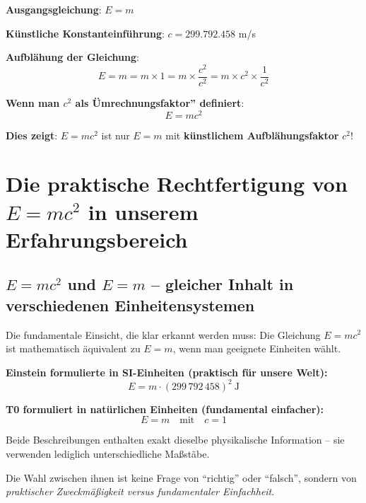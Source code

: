 	\textbf{Ausgangsgleichung}: $E = m$
	
	\textbf{Künstliche Konstanteinführung}: $c = 299.792.458$ m/s
	
	\textbf{Aufblähung der Gleichung}:
	\begin{equation}
		E = m = m \times 1 = m \times \frac{c^2}{c^2} = m \times c^2 \times \frac{1}{c^2}
	\end{equation}
	
	\textbf{Wenn man $c^2$ als Ümrechnungsfaktor'' definiert}:
	\begin{equation}
		E = mc^2
	\end{equation}
	
	\textbf{Dies zeigt}: $E = mc^2$ ist nur $E = m$ mit \textbf{künstlichem Aufblähungsfaktor} $c^2$!
	
	\section{Die praktische Rechtfertigung von \( E = mc^2 \) in unserem Erfahrungsbereich}
	
	\subsection{\( E = mc^2 \) und \( E = m \) – gleicher Inhalt in verschiedenen Einheitensystemen}
	
	\begin{tcolorbox}[colback=blue!10!white,colframe=blue!75!black,title=Die pragmatische Perspektive: Einheitensysteme und Konventionen]
		Die fundamentale Einsicht, die klar erkannt werden muss: Die Gleichung \( E = mc^2 \) ist mathematisch äquivalent zu \( E = m \), wenn man geeignete Einheiten wählt.
		
		\textbf{Einstein formulierte in SI-Einheiten (praktisch für unsere Welt):}
		\begin{equation}
			E = m \cdot (299\,792\,458)^2 \ \text{J} 
		\end{equation}
		
		\textbf{T0 formuliert in natürlichen Einheiten (fundamental einfacher):}
		\begin{equation}
			E = m \quad \text{mit} \quad c = 1
		\end{equation}
		
		Beide Beschreibungen enthalten exakt dieselbe physikalische Information – sie verwenden lediglich unterschiedliche Maßstäbe.
		
		Die Wahl zwischen ihnen ist keine Frage von ``richtig'' oder ``falsch'', sondern von \textit{praktischer Zweckmäßigkeit versus fundamentaler Einfachheit}.
	\end{tcolorbox}
	
